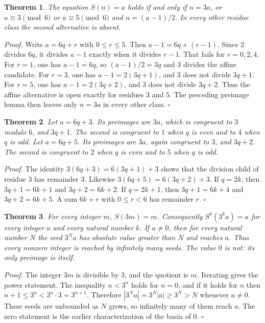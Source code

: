 \documentclass[11pt,letterpaper]{article}
\newtheorem{theorem}{Theorem}
\newenvironment{proof}{\noindent\textit{Proof.}}{\hfill\(\square\)}
\begin{document}
\begin{theorem}
\label{thm:branchmod}
The equation \(S(n)=a\) holds if and only if \(n=3a\), or \(a\equiv 3\pmod{6}\) or \(a\equiv 5\pmod{6}\) and \(n=(a-1)/2\). In every other residue class the second alternative is absent.
\end{theorem}

\begin{proof}
Write \(a=6q+r\) with \(0\le r\le 5\). Then \(a-1=6q+(r-1)\). Since \(2\) divides \(6q\), it divides \(a-1\) exactly when it divides \(r-1\). That fails for \(r=0,2,4\). For \(r=1\), one has \(a-1=6q\), so \((a-1)/2=3q\) and \(3\) divides the affine candidate. For \(r=3\), one has \(a-1=2(3q+1)\), and \(3\) does not divide \(3q+1\). For \(r=5\), one has \(a-1=2(3q+2)\), and \(3\) does not divide \(3q+2\). Thus the affine alternative is open exactly for residues \(3\) and \(5\). The preceding preimage lemma then leaves only \(n=3a\) in every other class.
\end{proof}

\begin{theorem}
\label{thm:children}
Let \(a=6q+3\). Its preimages are \(3a\), which is congruent to \(3\) modulo \(6\), and \(3q+1\). The second is congruent to \(1\) when \(q\) is even and to \(4\) when \(q\) is odd. Let \(a=6q+5\). Its preimages are \(3a\), again congruent to \(3\), and \(3q+2\). The second is congruent to \(2\) when \(q\) is even and to \(5\) when \(q\) is odd.
\end{theorem}

\begin{proof}
The identity \(3(6q+3)=6(3q+1)+3\) shows that the division child of residue \(3\) has remainder \(3\). Likewise \(3(6q+5)=6(3q+2)+3\). If \(q=2k\), then \(3q+1=6k+1\) and \(3q+2=6k+2\). If \(q=2k+1\), then \(3q+1=6k+4\) and \(3q+2=6k+5\). A sum \(6k+r\) with \(0\le r<6\) has remainder \(r\).
\end{proof}

\begin{theorem}
\label{thm:infinite}
For every integer \(m\), \(S(3m)=m\). Consequently \(S^{k}(3^{k}a)=a\) for every integer \(a\) and every natural number \(k\). If \(a\ne 0\), then for every natural number \(N\) the seed \(3^{N}a\) has absolute value greater than \(N\) and reaches \(a\). Thus every nonzero integer is reached by infinitely many seeds. The value \(0\) is not: its only preimage is itself.
\end{theorem}

\begin{proof}
The integer \(3m\) is divisible by \(3\), and the quotient is \(m\). Iterating gives the power statement. The inequality \(n<3^{n}\) holds for \(n=0\), and if it holds for \(n\) then \(n+1\le 3^{n}<3^{n}\cdot 3=3^{n+1}\). Therefore \(|3^{N}a|=3^{N}|a|\ge 3^{N}>N\) whenever \(a\ne 0\). These seeds are unbounded as \(N\) grows, so infinitely many of them reach \(a\). The zero statement is the earlier characterization of the basin of \(0\).
\end{proof}
\end{document}

